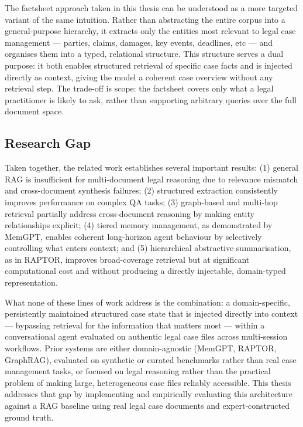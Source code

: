 The factsheet approach taken in this thesis can be understood as a more targeted variant of the same intuition. Rather than abstracting the entire corpus into a general-purpose hierarchy, it extracts only the entities most relevant to legal case management --- parties, claims, damages, key events, deadlines, etc --- and organises them into a typed, relational structure. This structure serves a dual purpose: it both enables structured retrieval of specific case facts and is injected directly as context, giving the model a coherent case overview without any retrieval step. The trade-off is scope: the factsheet covers only what a legal practitioner is likely to ask, rather than supporting arbitrary queries over the full document space.

\subsection{Research Gap}
\label{sec:research-gap}

Taken together, the related work establishes several important results: (1) general RAG is insufficient for multi-document legal reasoning due to relevance mismatch and cross-document synthesis failures; (2) structured extraction consistently improves performance on complex QA tasks; (3) graph-based and multi-hop retrieval partially address cross-document reasoning by making entity relationships explicit; (4) tiered memory management, as demonstrated by MemGPT, enables coherent long-horizon agent behaviour by selectively controlling what enters context; and (5) hierarchical abstractive summarisation, as in RAPTOR, improves broad-coverage retrieval but at significant computational cost and without producing a directly injectable, domain-typed representation.

What none of these lines of work address is the combination: a domain-specific, persistently maintained structured case state that is injected directly into context --- bypassing retrieval for the information that matters most --- within a conversational agent evaluated on authentic legal case files across multi-session workflows. Prior systems are either domain-agnostic (MemGPT, RAPTOR, GraphRAG), evaluated on synthetic or curated benchmarks rather than real case management tasks, or focused on legal reasoning rather than the practical problem of making large, heterogeneous case files reliably accessible. This thesis addresses that gap by implementing and empirically evaluating this architecture against a RAG baseline using real legal case documents and expert-constructed ground truth.

